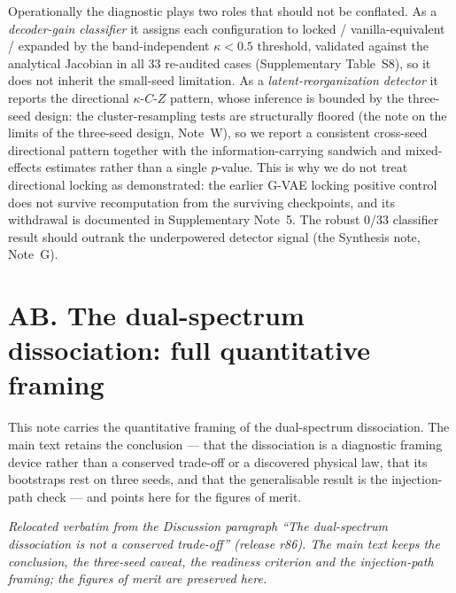 \documentclass[11 pt,a4 paper]{article}
\begin{document}
Operationally the diagnostic plays two roles that should not be conflated. As a \emph{decoder-gain classifier} it assigns each configuration to locked / vanilla-equivalent / expanded by the band-independent $\kappa<0.5$ threshold, validated against the analytical Jacobian in all 33 re-audited cases (Supplementary Table~S8), so it does not inherit the small-seed limitation. As a \emph{latent-reorganization detector} it reports the directional $\kappa$-$C$-$Z$ pattern, whose inference is bounded by the three-seed design: the cluster-resampling tests are structurally floored (the note on the limits of the three-seed design, Note~W), so we report a consistent cross-seed directional pattern together with the information-carrying sandwich and mixed-effects estimates rather than a single $p$-value. This is why we do not treat directional locking as demonstrated: the earlier G-VAE locking positive control does not survive recomputation from the surviving checkpoints, and its withdrawal is documented in Supplementary Note~5. The robust 0/33 classifier result should outrank the underpowered detector signal (the Synthesis note, Note~G).

\clearpage

\section*{AB. The dual-spectrum dissociation: full quantitative framing}

This note carries the quantitative framing of the dual-spectrum dissociation. The main text
retains the conclusion --- that the dissociation is a diagnostic framing device rather than a
conserved trade-off or a discovered physical law, that its bootstraps rest on three seeds, and
that the generalisable result is the injection-path check --- and points here for the figures of
merit.

\noindent\emph{Relocated verbatim from the Discussion paragraph ``The dual-spectrum dissociation is not a conserved trade-off'' (release r86). The main text keeps the conclusion, the three-seed caveat, the readiness criterion and the injection-path framing; the figures of merit are preserved here.}
\end{document}
